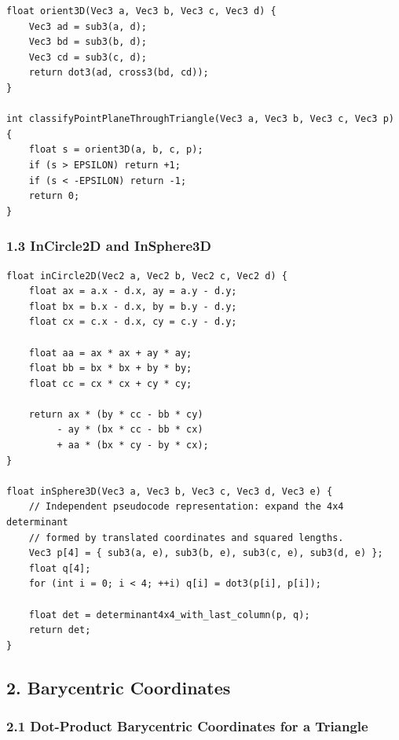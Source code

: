 \documentclass[10pt,letterpaper]{article}
\begin{document}
\begin{verbatim}
float orient3D(Vec3 a, Vec3 b, Vec3 c, Vec3 d) {
    Vec3 ad = sub3(a, d);
    Vec3 bd = sub3(b, d);
    Vec3 cd = sub3(c, d);
    return dot3(ad, cross3(bd, cd));
}

int classifyPointPlaneThroughTriangle(Vec3 a, Vec3 b, Vec3 c, Vec3 p) {
    float s = orient3D(a, b, c, p);
    if (s > EPSILON) return +1;
    if (s < -EPSILON) return -1;
    return 0;
}
\end{verbatim}


\subsubsection*{1.3 InCircle2D and InSphere3D}

\begin{verbatim}
float inCircle2D(Vec2 a, Vec2 b, Vec2 c, Vec2 d) {
    float ax = a.x - d.x, ay = a.y - d.y;
    float bx = b.x - d.x, by = b.y - d.y;
    float cx = c.x - d.x, cy = c.y - d.y;

    float aa = ax * ax + ay * ay;
    float bb = bx * bx + by * by;
    float cc = cx * cx + cy * cy;

    return ax * (by * cc - bb * cy)
         - ay * (bx * cc - bb * cx)
         + aa * (bx * cy - by * cx);
}

float inSphere3D(Vec3 a, Vec3 b, Vec3 c, Vec3 d, Vec3 e) {
    // Independent pseudocode representation: expand the 4x4 determinant
    // formed by translated coordinates and squared lengths.
    Vec3 p[4] = { sub3(a, e), sub3(b, e), sub3(c, e), sub3(d, e) };
    float q[4];
    for (int i = 0; i < 4; ++i) q[i] = dot3(p[i], p[i]);

    float det = determinant4x4_with_last_column(p, q);
    return det;
}
\end{verbatim}


\subsection*{2. Barycentric Coordinates}


\subsubsection*{2.1 Dot-Product Barycentric Coordinates for a Triangle}
\end{document}
